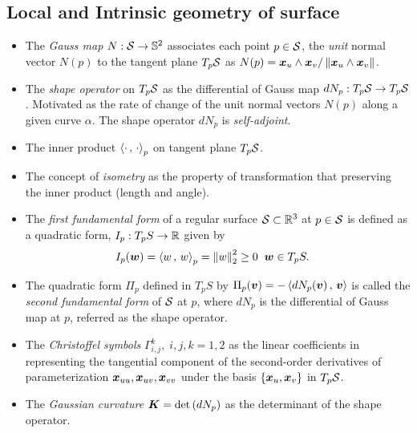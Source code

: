 \documentclass[11pt]{article}
\begin{document}
\subsection{Local and Intrinsic geometry of surface}
\begin{itemize}
\item The \emph{Gauss map} $N: {\mathcal S} \rightarrow {\mathbb S}^{2}$ associates each point $p\in {\mathcal S}$, the \emph{unit} normal vector $N(p)$ to the tangent plane $T_{p}{\mathcal S}$ as $N(p) = \boldsymbol{x}_{u}\wedge \boldsymbol{x}_{v} /\left\|\boldsymbol{x}_{u}\wedge \boldsymbol{x}_{v}\right\|_{}$.

\item The \emph{shape operator} on $T_{p}{\mathcal S}$ as the differential of Gauss map $dN_{p}: T_{p}{\mathcal S} \rightarrow T_{p}{\mathcal S}$. Motivated as the rate of change of the unit normal vectors $N(p)$ along a given curve $\alpha$. The shape operator $dN_{p}$ is \emph{self-adjoint}. \\[10pt]

\item The inner product  $\left\langle \cdot\,,\, \cdot \right\rangle_{p}$ on tangent plane $T_{p}{\mathcal S}$. 

\item The concept of \emph{isometry} as the property of transformation that preserving the inner product (length and angle).

\item The \emph{first fundamental form} of a regular surface ${\mathcal S}\subset {\mathbb R}^{3}$ at $p\in {\mathcal S}$ is defined as a  quadratic form,  $I_{p}: T_{p}S \rightarrow {\mathbb R}$ given by 
\begin{align*}
I_{p}(\boldsymbol{w}) &= \left\langle w\,,\, w \right\rangle_{p} = \left\|w\right\|_{2}^{2} \ge 0\; \; \boldsymbol{w}\in T_{p}S.
\end{align*}

\item  The quadratic form $\Pi_{p}$ defined in $T_{p}S$ by $\Pi_{p}(\boldsymbol{v}) = -\left\langle dN_{p}(\boldsymbol{v})\,,\, \boldsymbol{v} \right\rangle$ is called the \emph{second fundamental form} of ${\mathcal S}$ at $p$, where $dN_{p}$ is the differential of Gauss map at $p$, referred as the shape operator.  

\item The \emph{Christoffel symbols} $\Gamma_{i,j}^{k},\; i,j,k=1,2$ as the linear coefficients in representing the tangential component of the second-order derivatives of parameterization $\boldsymbol{x}_{uu}, \boldsymbol{x}_{uv}, \boldsymbol{x}_{vv}$ under the basis $\left\{\boldsymbol{x}_{u}, \boldsymbol{x}_{v}\right\}$ in $T_{p}{\mathcal S}$.

\item The \emph{Gaussian curvature} $\boldsymbol{K} = \det\left(dN_{p}\right)$ as the determinant of the shape operator. 


\end{itemize}
\end{document}
